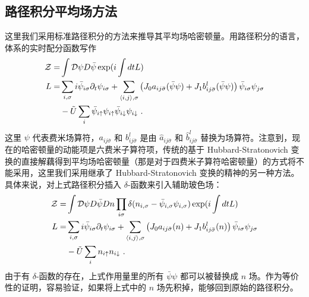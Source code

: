 \subsection{路径积分平均场方法} \label{sec:floq:pathint}
这里我们采用标准路径积分的方法来推导其平均场哈密顿量。用路径积分的语言，体系的实时配分函数写作
\begin{align}
\mathcal{Z}=&\int \mathcal D\psi D\bar\psi \exp(i\int dt L)  \\
L=&\sum_{i,\sigma} i\bar \psi_{i\sigma}\partial_t\psi_{i\sigma}+\sum_{\langle i,j\rangle, \sigma} \left(J_0a_{ij\bar{\sigma}}(\bar\psi \psi) + J_1b_{ij\bar{\sigma}}^l(\bar\psi\psi)\right)\bar \psi_{i\sigma}\psi_{j\sigma} \notag \\&- \tilde{U}\sum_{i}\bar\psi_{i\uparrow}\psi_{i\uparrow}\bar\psi_{i\downarrow}\psi_{i\downarrow} \  .
\end{align}
这里 $\psi$ 代表费米场算符，$a_{ij\bar{\sigma}}$ 和 $b_{ij\bar{\sigma}}^l$ 是由 $\hat a_{ij\bar{\sigma}}$ 和 $\hat b_{ij\bar{\sigma}}^l$ 替换为场算符。注意到，现在的哈密顿量的动能项是六费米子算符项，传统的基于 Hubbard-Stratonovich 变换的直接解藕得到平均场哈密顿量（那是对于四费米子算符哈密顿量）的方式将不能采用，这里我们采用继承了 Hubbard-Stratonovich 变换的精神的另一种方法。具体来说，对上式路径积分插入 $\delta$-函数来引入辅助玻色场：
\begin{align}
\mathcal{Z}=&\int \mathcal D\psi D\bar\psi Dn \prod_{i\sigma}\delta(n_{i,\sigma}-\bar\psi_{i,\sigma}\psi_{i,\sigma})\exp(i\int dt L)\\
L=&\sum_{i,\sigma} i\bar \psi_{i\sigma}\partial_t\psi_{i\sigma}+\sum_{\langle i,j\rangle, \sigma} \left(J_0a_{ij\bar{\sigma}}(n) + J_1b_{ij\bar{\sigma}}^l(n)\right)\bar \psi_{i\sigma}\psi_{j\sigma}  \notag \\&- \tilde{U}\sum_{i}n_{i\uparrow}n_{i\downarrow} \  .
\end{align}
由于有 $\delta$-函数的存在，上式作用量里的所有 $\bar\psi\psi$ 都可以被替换成 $n$ 场。作为等价性的证明，容易验证，如果将上式中的 $n$ 场先积掉，能够回到原始的路径积分。

